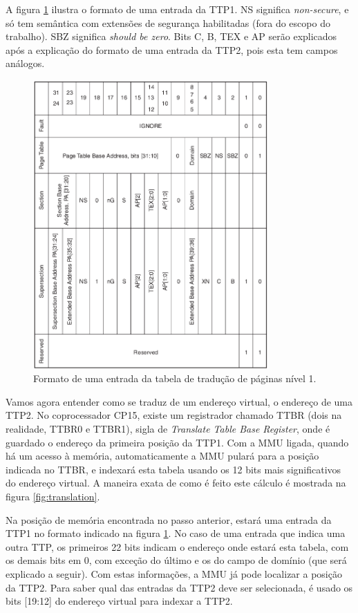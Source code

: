 A figura \ref{fig:l1_entry} ilustra o formato de uma entrada da TTP1. NS significa \emph{non-secure}, e só tem semântica com extensões de segurança habilitadas (fora do escopo do trabalho). SBZ significa \emph{should be zero}. Bits C, B, TEX e AP serão explicados após a explicação do formato de uma entrada da TTP2, pois esta tem campos análogos.

\begin{figure}[hb!]
    \centering
    \includegraphics[width=9cm]{figuras/l1_entry}
    \caption{Formato de uma entrada da tabela de tradução de páginas nível 1.}
	\label{fig:l1_entry}
\end{figure}

Vamos agora entender como se traduz de um endereço virtual, o endereço de uma TTP2. No coprocessador CP15, existe um registrador chamado TTBR (dois na realidade, TTBR0 e TTBR1), sigla de \emph{Translate Table Base Register}, onde é guardado o endereço da primeira posição da TTP1. Com a MMU ligada, quando há um acesso à memória, automaticamente a MMU pulará para a posição indicada no TTBR, e indexará esta tabela usando os 12 bits mais significativos do endereço virtual. A maneira exata de como é feito este cálculo é mostrada na figura \ref{fig:translation}.

Na posição de memória encontrada no passo anterior, estará uma entrada da TTP1 no formato indicado na figura \ref{fig:l1_entry}. No caso de uma entrada que indica uma outra TTP, os primeiros 22 bits indicam o endereço onde estará esta tabela, com os demais bits em 0, com exceção do último e os do campo de domínio (que será explicado a seguir). Com estas informações, a MMU já pode localizar a posição da TTP2. Para saber qual das entradas da TTP2 deve ser selecionada, é usado os bits [19:12] do endereço virtual para indexar a TTP2.

